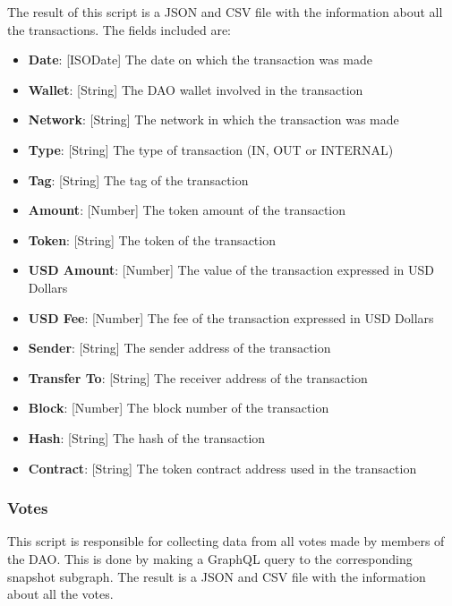 \documentclass[MSE,Master,english]{twbook}%
\begin{document}
The result of this script is a JSON and CSV file with the information about all the transactions. The fields included are:
\begin{itemize}
  \item \textbf{Date}: [ISODate] The date on which the transaction was made
  \item \textbf{Wallet}: [String] The DAO wallet involved in the transaction
  \item \textbf{Network}: [String] The network in which the transaction was made
  \item \textbf{Type}: [String] The type of transaction (IN, OUT or INTERNAL)
  \item \textbf{Tag}: [String] The tag of the transaction
  \item \textbf{Amount}: [Number] The token amount of the transaction
  \item \textbf{Token}: [String] The token of the transaction
  \item \textbf{USD Amount}: [Number] The value of the transaction expressed in USD Dollars
  \item \textbf{USD Fee}: [Number] The fee of the transaction expressed in USD Dollars
  \item \textbf{Sender}: [String] The sender address of the transaction
  \item \textbf{Transfer To}: [String] The receiver address of the transaction
  \item \textbf{Block}: [Number] The block number of the transaction
  \item \textbf{Hash}: [String] The hash of the transaction
  \item \textbf{Contract}: [String] The token contract address used in the transaction
\end{itemize}

\subsubsection{Votes\label{subsec_votes}}
This script is responsible for collecting data from all votes made by members of the DAO. This is done by making a GraphQL query to the corresponding snapshot subgraph. The result is a JSON and CSV file with the information about all the votes. \\
\end{document}
